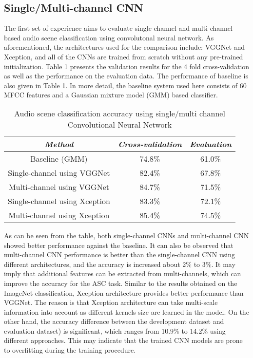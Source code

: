 \documentclass[conference]{IEEEtran}
\begin{document}
\subsection{Single/Multi-channel CNN}

The first set of experience aims to evaluate single-channel and multi-channel based audio scene classification using convolutonal neural network. As aforementioned, the architectures used for the comparison include: VGGNet and Xception, and all of the CNNs are trained from scratch without any pre-trained initialization. Table 1 presents the validation results for the 4 fold cross-validation as well as the performance on the evaluation data. The performance of baseline is also given in Table 1. In more detail, the baseline system used here consists of 60 MFCC features and a Gaussian mixture model (GMM) based classifier.
\begin{table}[htbp]
	\caption{Audio scene classification accuracy using single/multi channel Convolutional Neural Network}
	\begin{center}
		\begin{tabular}{|c|c|c|}
			\cline{1-3}
			\textbf{\textit{Method}}& \textbf{\textit{Cross-validation}}& \textbf{\textit{Evaluation}} \\
			\hline
			Baseline (GMM) & 74.8\%  & 61.0\%  \\
			Single-channel using VGGNet & 82.4\%  & 67.8\%  \\
			Multi-channel using VGGNet & 84.7\%  & 71.5\%  \\
			Single-channel using Xception & 83.3\%  & 72.1\%  \\
			Multi-channel using Xception & 85.4\%  & 74.5\%  \\
			\hline
		\end{tabular}
		\label{tab1}
	\end{center}
\end{table}
As can be seen from the table, both single-channel CNNs and multi-channel CNN showed better performance against the baseline. It can also be observed that multi-channel CNN performance is better than the single-channel CNN using different architectures, and the accuracy is increased about 2\% to 3\%. It may imply that additional features can be extracted from multi-channels, which can improve the accuracy for the ASC task. Similar to the results obtained on the ImageNet classification, Xception architecture provides better performance than VGGNet. The reason is that Xception architecture can take multi-scale information into account as different kernels size are learned in the model.
On the other hand, the accuracy difference between the development dataset and evaluation dataset) is significant, which ranges from 10.9\% to 14.2\% using different approaches. This may indicate that the trained CNN models are prone to overfitting during the training procedure.
\end{document}
